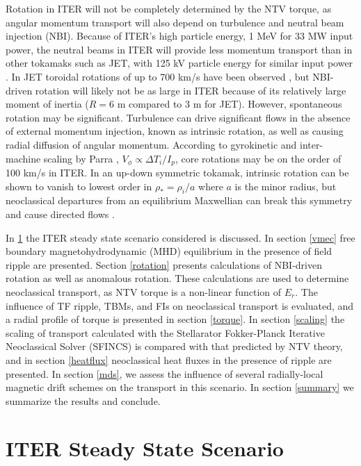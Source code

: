 \documentclass{article}
\begin{document}
Rotation in ITER will not be completely determined by the NTV torque, as angular momentum transport will also depend on turbulence and neutral beam injection (NBI). Because of ITER's high particle energy, 1 MeV for 33 MW input power, the neutral beams in ITER will provide less momentum transport than in other tokamaks such as JET, with 125 kV particle energy for similar input power \cite{Ciric2011}. In JET toroidal rotations of up to 700 km/s have been observed \cite{DeVries2008}, but NBI-driven rotation will likely not be as large in ITER because of its relatively large moment of inertia ($R = 6$ m compared to 3 m for JET). However, spontaneous rotation may be significant. Turbulence can drive significant flows in the absence of external momentum injection, known as intrinsic rotation, as well as causing radial diffusion of angular momentum. According to gyrokinetic and inter-machine scaling by Parra \cite{Parra2012}, $V_{\phi} \propto \Delta T_i/I_p$, core rotations may be on the order of 100 km/s in ITER.  In an up-down symmetric tokamak, intrinsic rotation can be shown to vanish to lowest order in $\rho_* = \rho_i/a$ where $a$ is the minor radius, but neoclassical departures from an equilibrium Maxwellian can break this symmetry and cause directed flows \cite{Barnes2013}. 

In \ref{steadystate} the ITER steady state scenario considered is discussed. In section \ref{vmec} free boundary magnetohydrodynamic (MHD) equilibrium in the presence of field ripple are presented. Section \ref{rotation} presents calculations of NBI-driven rotation as well as anomalous rotation. These calculations are used to determine neoclassical transport, as NTV torque is a non-linear function of $E_r$. The influence of TF ripple, TBMs, and FIs on neoclassical transport is evaluated, and a radial profile of torque is presented in section \ref{torque}. In section \ref{scaling} the scaling of transport calculated with the Stellarator Fokker-Planck Iterative Neoclassical Solver (SFINCS) is compared with that predicted by NTV theory, and in section \ref{heatflux} neoclassical heat fluxes in the presence of ripple are presented. In section \ref{mds}, we assess the influence of several radially-local magnetic drift schemes on the transport in this scenario. In section \ref{summary} we summarize the results and conclude.

\section{ITER Steady State Scenario}\label{steadystate}
\end{document}
